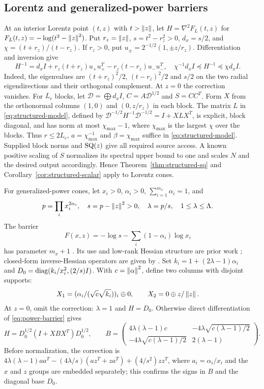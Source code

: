 \subsection{Lorentz and generalized-power barriers}
At an interior Lorentz point $(t,z)$ with $t>\left\lVert z\right\rVert$, let
$H=\nabla^2 F_L(t,z)$ for $F_L(t,z)=-\log(t^2-\left\lVert z\right\rVert^2)$.
Put $r_z=\left\lVert z\right\rVert$, $s=t^2-r_z^2>0$,
$d_x=s/2$, and $\chi=(t+r_z)/(t-r_z)$. If $r_z>0$, put
$u_\pm=2^{-1/2}(1,\pm z/r_z)$. Differentiation and inversion give
\begin{equation}\label{eq:lorentz-structured}
 H^{-1}=d_x I+r_z(t+r_z)u_+u_+^T-r_z(t-r_z)u_-u_-^T,
 \quad \chi^{-1}d_xI\preceq H^{-1}\preceq\chi d_xI.
\end{equation}
Indeed, the eigenvalues are $(t+r_z)^2/2$, $(t-r_z)^2/2$ and $s/2$
on the two radial eigendirections and their orthogonal complement. At
$z=0$ the correction vanishes. For $L_c$ blocks, let
$\mathcal D=\bigoplus d_xI$, $C=A\mathcal D^{1/2}$ and $S=CC^T$.
Form $X$ from the orthonormal columns $(1,0)$ and $(0,z/r_z)$ in each block.
The matrix $L$ in \eqref{eq:structured-model}, defined by
$\mathcal D^{-1/2}H^{-1}\mathcal D^{-1/2}=I+XLX^T$, is explicit, block
diagonal, and has norm at most $\chi_{\max}-1$, where $\chi_{\max}$ is the
largest $\chi$ over the blocks. Thus $r\leq2L_c$,
$a=\chi_{\max}^{-1}$ and $\beta=\chi_{\max}$ suffice in
\eqref{eq:structured-model}. Supplied block norms and $\mathrm{SQ}(z)$ give all
required source access. A known positive scaling of $S$ normalizes its
spectral upper bound to one and scales $N$ and the desired output
accordingly. Hence Theorem~\ref{thm:structured-sq} and
Corollary~\ref{cor:structured-scalar} apply to Lorentz cones.

For generalized-power cones, let $x_i>0$, $\alpha_i>0$,
$\sum_{i=1}^{m_x}\alpha_i=1$, and
\[
 p=\prod_i x_i^{2\alpha_i},\quad s=p-\left\lVert z\right\rVert^2>0,
 \quad \lambda=p/s,\quad 1\leq\lambda\leq\Lambda.
\]
The barrier
\begin{equation}\label{eq:power-barrier}
 F(x,z)=-\log s-\sum_i(1-\alpha_i)\log x_i
\end{equation}
has parameter $m_x+1$ \citep{RoyXiao2022}. Its use and low-rank Hessian
structure are prior work \citep{ChenGoulart2025};
closed-form inverse-Hessian operators are given by
\citet{KapelevichAndersenVielma2024}.
Set $k_i=1+(2\lambda-1)\alpha_i$ and
$D_0=\operatorname{diag}(k_i/x_i^2,(2/s)I)$. With $c=\left\lVert\alpha\right\rVert^2$,
define two columns with disjoint supports:
\[
 X_1=(\alpha_i/(\sqrt c\sqrt{k_i}))_i\oplus0,
 \qquad X_2=0\oplus z/\left\lVert z\right\rVert.
\]
At $z=0$, omit the correction: $\lambda=1$ and $H=D_0$.
Otherwise direct differentiation of \eqref{eq:power-barrier} gives
\begin{equation}\label{eq:power-normalized}
 H=D_0^{1/2}(I+XBX^T)D_0^{1/2},\qquad
 B=\begin{pmatrix}
 4\lambda(\lambda-1)c&-4\lambda\sqrt{c(\lambda-1)/2}\\
 -4\lambda\sqrt{c(\lambda-1)/2}&2(\lambda-1)
 \end{pmatrix}.
\end{equation}
Before normalization, the correction is
$4\lambda(\lambda-1)aa^T-(4\lambda/s)(az^T+za^T)+(4/s^2)zz^T$,
where $a_i=\alpha_i/x_i$ and the $x$ and $z$ groups are embedded
separately; this confirms the signs in $B$ and the diagonal base $D_0$.

